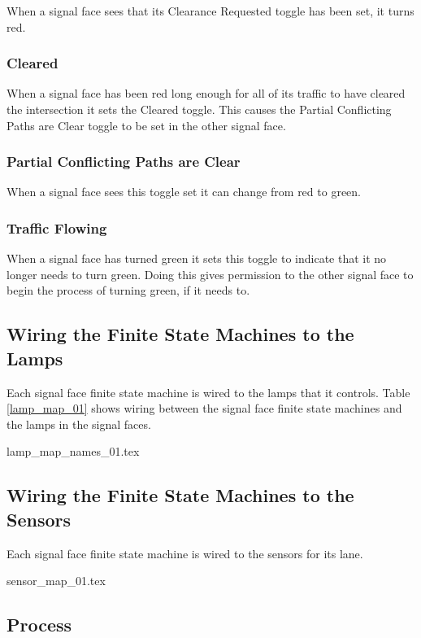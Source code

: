\documentclass[letterpaper,twoside]{article}
\begin{document}
When a signal face sees that its Clearance Requested toggle has been
set, it turns red.

\subsubsection{Cleared}

When a signal face has been red long enough for all of its traffic
to have cleared the intersection it sets the Cleared toggle.
This causes the Partial Conflicting Paths are Clear toggle to be set
in the other signal face.

\subsubsection{Partial Conflicting Paths are Clear}

When a signal face sees this toggle set it can change from red
to green.

\subsubsection{Traffic Flowing}

When a signal face has turned green it sets this toggle to indicate
that it no longer needs to turn green.  Doing this gives permission
to the other signal face to begin the process of turning green,
if it needs to.

\subsection{Wiring the Finite State Machines to the Lamps}

Each signal face finite state machine is wired to the lamps that
it controls.  Table \ref{lamp_map_01} shows wiring between the signal
face finite state machines and the lamps in the signal faces.

 {lamp_map_names_01.tex}

\subsection{Wiring the Finite State Machines to the Sensors}

Each signal face finite state machine is wired to the sensors
for its lane.

 {sensor_map_01.tex}

\subsection{Process}
\end{document}
